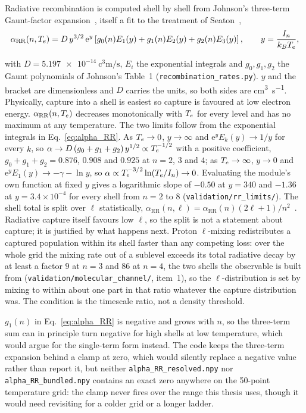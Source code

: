 Radiative recombination is computed shell by shell from Johnson's three-term
Gaunt-factor expansion~\cite{Johnson1972}, itself a fit to the treatment of
Seaton~\cite{Seaton1959},
\begin{equation}
  \alpha_{\mathrm{RR}}(n,T_e)
  = D\,y^{3/2}\,\mathrm{e}^{y}
    \left[g_0(n)E_1(y) + g_1(n)E_2(y) + g_2(n)E_3(y)\right],
  \qquad y = \frac{I_n}{k_BT_e},
  \label{eq:alpha_RR}
\end{equation}

\noindent with $D = \SI{5.197e-14}{\cubic\centi\metre\per\second}$, $E_i$ the
exponential integrals and $g_0,g_1,g_2$ the Gaunt polynomials of Johnson's
Table~1 (\texttt{recombination\_rates.py}). $y$ and the bracket are
dimensionless and $D$ carries the units, so both sides are
\si{\cubic\centi\metre\per\second}. Physically, capture into a shell is easiest
so capture is favoured at low electron energy. $\alpha_{\mathrm{RR}}(n,T_e)$ decreases monotonically with $T_e$ for every
level and has no maximum at any temperature. The two limits follow from the
exponential integrals in Eq.~\eqref{eq:alpha_RR}. As $T_e \to 0$,
$y \to \infty$ and $\mathrm{e}^{y}E_k(y) \to 1/y$ for every $k$, so
$\alpha \to D\,(g_0+g_1+g_2)\,y^{1/2} \propto T_e^{-1/2}$ with a positive
coefficient, $g_0+g_1+g_2 = 0.876$, $0.908$ and $0.925$ at $n = 2$, $3$ and
$4$; as $T_e \to \infty$, $y \to 0$ and
$\mathrm{e}^{y}E_1(y) \to -\gamma - \ln y$, so
$\alpha \propto T_e^{-3/2}\ln(T_e/I_n) \to 0$. Evaluating the module's own
function at fixed $y$ gives a logarithmic slope of $-0.50$ at $y = 340$ and
$-1.36$ at $y = 3.4\times10^{-4}$ for every shell from $n=2$ to $8$
(\texttt{validation/rr\_limits/}). The shell total is split over
$\ell$ statistically, $\alpha_{\mathrm{RR}}(n,\ell) =
\alpha_{\mathrm{RR}}(n)(2\ell+1)/n^{2}$~\cite{MaoKaastra2016}. Radiative
capture itself favours low $\ell$, so the split is not a statement about
capture; it is justified by what happens next. Proton $\ell$-mixing
redistributes a captured population within its shell faster than any
competing loss: over the whole grid the mixing rate out of a sublevel exceeds
its total radiative decay by at least a factor $9$ at $n=3$ and $86$ at $n=4$,
the two shells the observable is built from
(\texttt{validation/molecular\_channel/}, item~1), so the $\ell$-distribution
is set by mixing to within about one part in that ratio whatever the capture
distribution was. The condition is the timescale ratio, not a density
threshold.

$g_1(n)$ in Eq.~\eqref{eq:alpha_RR} is negative and grows with $n$, so the
three-term sum can in principle turn negative for high shells at low
temperature, which would argue for the single-term form instead. The code keeps the three-term
expansion behind a clamp at zero, which would silently replace a negative value
rather than report it, but neither \texttt{alpha\_RR\_resolved.npy} nor
\texttt{alpha\_RR\_bundled.npy} contains an exact zero anywhere on the 50-point
temperature grid: the clamp never fires over the range this thesis uses, though
it would need revisiting for a colder grid or a longer ladder.

